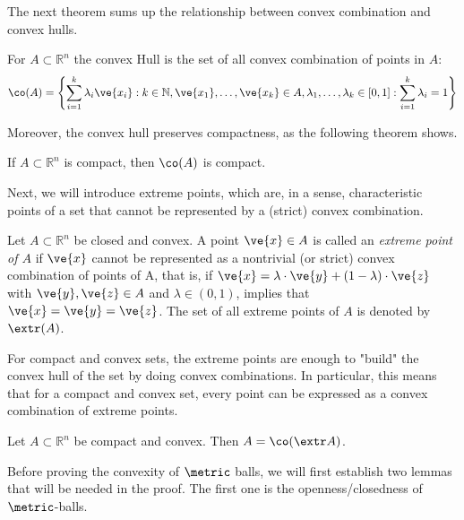 The next theorem sums up the relationship between convex combination and convex hulls.
\begin{thm} \label{thm-conv-hull-all-conv-combs}
	For $A \subset \mathbb{R}^{n}$ the convex Hull is the set of all convex combination of points in $A$:
	$$
		\co(A) =  \left \{\sum_{i=1}^{k} \lambda_i \ve{x_i} : k \in \mathbb{N}, \ve{x_1}, \dots, \ve{x_k} \in A, \lambda_1, \dots, \lambda_k \in [0,1]: \sum_{i=1}^{k} \lambda_i = 1 \right \}
	$$
\end{thm}

Moreover, the convex hull preserves compactness, as the following theorem shows.
\begin{thm} \label{thm-compact-hull-compact}
	If $A \subset \mathbb{R}^{n}$ is compact, then $\co(A)$ is compact.
\end{thm}

Next, we will introduce extreme points, which are, in a sense, characteristic points of a set that cannot be represented by a (strict) convex combination.

\begin{defi}\label{def-extreme-point}  %
  Let $A \subset \mathbb{R}^{n}$ be closed and convex. A point $\ve{x} \in A$ is called an \emph{extreme point of $A$} if $\ve{x}$ cannot be represented as a nontrivial (or strict) convex combination of points of A, that is, if $\ve{x} = \lambda \cdot \ve{y} + (1-\lambda) \cdot \ve{z}$ with $\ve{y}, \ve{z} \in A$ and $\lambda \in (0,1)$, implies that $\ve{x} = \ve{y} = \ve{z}$. The set of all extreme points of $A$ is denoted by $\extr(A)$.
\end{defi}


For compact and convex sets, the extreme points are enough to "build" the convex hull of the set by doing convex combinations.
In particular, this means that for a compact and convex set, every point can be expressed as a convex combination of extreme points.

\begin{thm} \label{thm-minkowski}
	Let $A \subset \mathbb{R}^{n}$ be compact and convex. Then $A = \co (\extr A)$.
\end{thm}



Before proving the convexity of $\metric$ balls, we will first establish two lemmas that will be needed in the proof.
The first one is the openness/closedness of $\metric$-balls.

